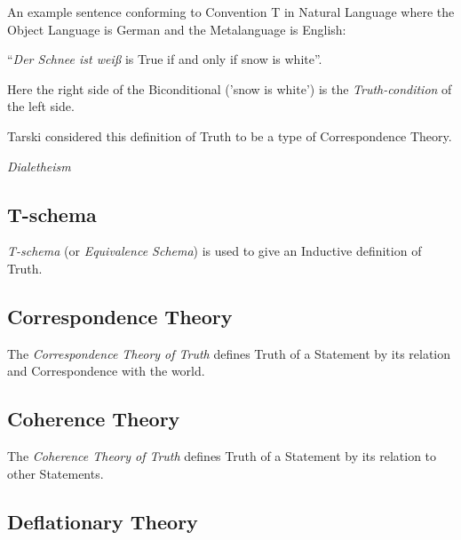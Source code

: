 An example sentence conforming to Convention T in Natural Language
where the Object Language is German and the Metalanguage is English:
\begin{description}
  \item ``\emph{Der Schnee ist wei\ss} is True if and only if snow is
    white''.
\end{description}
Here the right side of the Biconditional ('snow is white') is the
\emph{Truth-condition} of the left side.

Tarski considered this definition of Truth to be a type of
Correspondence Theory.

\emph{Dialetheism}



\subsection{T-schema}\label{sec:t_schema}

\emph{T-schema} (or \emph{Equivalence Schema}) is used to give an
Inductive definition of Truth.



\subsection{Correspondence Theory}\label{sec:correspondence_truth}

The \emph{Correspondence Theory of Truth} defines Truth of a Statement
by its relation and Correspondence with the world.



\subsection{Coherence Theory}\label{sec:coherence_theory}

The \emph{Coherence Theory of Truth} defines Truth of a Statement by
its relation to other Statements.



\subsection{Deflationary Theory}\label{sec:deflationary_truth}

